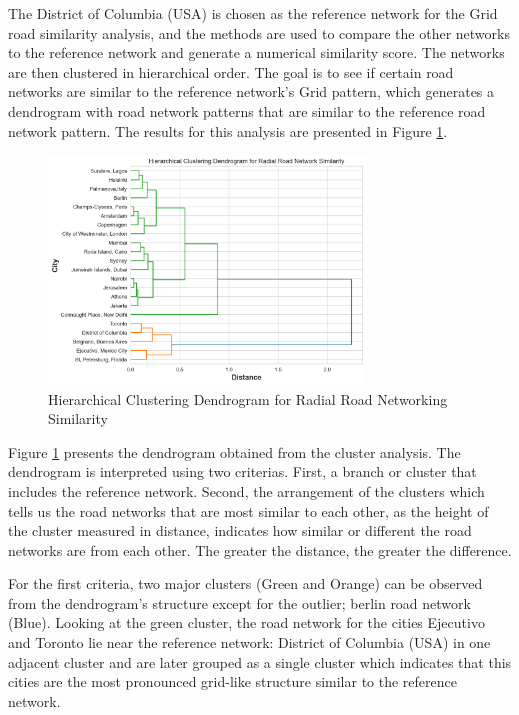 The District of Columbia (USA) is chosen as the reference network for the Grid road similarity analysis, and the methods are used to compare the other networks to the reference network and generate a numerical similarity score. The networks are then clustered in hierarchical order. The goal is to see if certain road networks are similar to the reference network's Grid pattern, which generates a dendrogram with road network patterns that are similar to the reference road network pattern. The results for this analysis are presented in Figure \ref{fig:Hierarchical Clustering Dendrogram for Radial Road Networking Similarity}.

\begin{figure}[!ht]
\centering
\includegraphics[width=0.75\textwidth,center]{picture/Radial/radial_dendrogram2.png}
\caption[Hierarchical Clustering Dendrogram for Radial Road Networking Similarity]{Hierarchical Clustering Dendrogram for Radial Road Networking Similarity}
\label{fig:Hierarchical Clustering Dendrogram for Radial Road Networking Similarity}
\end{figure}

Figure \ref{fig:Hierarchical Clustering Dendrogram for Radial Road Networking Similarity} presents the dendrogram obtained from the cluster analysis. The dendrogram  is interpreted using two criterias. First, a branch or cluster that includes the reference network. Second, the arrangement of the clusters which tells us the road networks that are most similar to each other, as the height of the cluster measured in distance, indicates how similar or different the road networks are from each other. The greater the distance, the greater the difference. 

For the first criteria, two major clusters (Green and Orange) can be observed from the dendrogram's structure except for the outlier; berlin road network (Blue). Looking at the green cluster, the road network for the cities Ejecutivo and Toronto lie near the reference network: District of Columbia (USA) in one adjacent cluster and are later grouped as a single cluster which indicates that this cities are the most pronounced grid-like structure similar to the reference network. 

